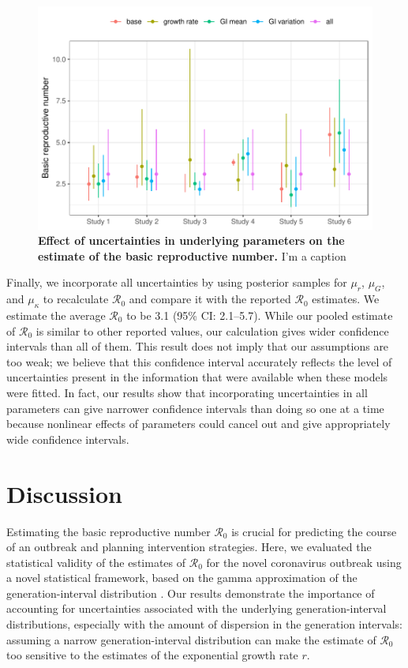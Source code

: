 \documentclass[12pt]{article}
\begin{document}
\begin{figure}[t]
\includegraphics[width=\textwidth]{compare_R0.pdf}
\caption{
\textbf{Effect of uncertainties in underlying parameters on the estimate of the basic reproductive number.}
I'm a caption
}
\label{fig:R0}
\end{figure}

Finally, we incorporate all uncertainties by using posterior samples for $\mu_r$, $\mu_G$, and $\mu_\kappa$ to recalculate $\mathcal R_0$ and compare it with the reported $\mathcal R_0$ estimates.
We estimate the average $\mathcal R_0$ to be 3.1 (95\% CI: 2.1--5.7).
While our pooled estimate of $\mathcal R_0$ is similar to other reported values, our calculation gives wider confidence intervals than all of them.
This result does not imply that our assumptions are too weak;
we believe that this confidence interval accurately reflects the level of uncertainties present in the information that were available when these models were fitted.
In fact, our results show that incorporating uncertainties in all parameters can give narrower confidence intervals than doing so one at a time because nonlinear effects of parameters could cancel out and give appropriately wide confidence intervals.

\section{Discussion}

Estimating the basic reproductive number $\mathcal R_0$ is crucial for predicting the course of an outbreak and planning intervention strategies.
Here, we evaluated the statistical validity of the estimates of $\mathcal R_0$ for the novel coronavirus outbreak using a novel statistical framework, based on the gamma approximation of the generation-interval distribution \citep{park2019practical}.
Our results demonstrate the importance of accounting for uncertainties associated with the underlying generation-interval distributions, especially with the amount of dispersion in the generation intervals:
assuming a narrow generation-interval distribution can make the estimate of $\mathcal R_0$ too sensitive to the estimates of the exponential growth rate $r$.
\end{document}
